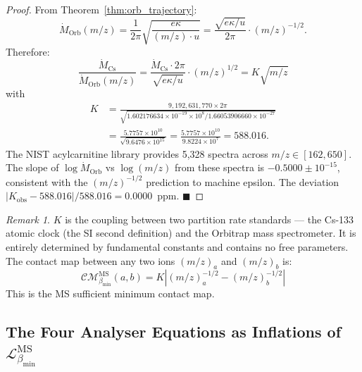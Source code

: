 \documentclass[11pt,twocolumn,a4paper]{article}
\theoremstyle{plain}
\theoremstyle{definition}
\theoremstyle{remark}
\newtheorem{remark}[theorem]{Remark}
\newcommand{\bmin}{\beta_{\min}}
\newcommand{\Lmin}{\mathcal{L}_{\bmin}}
\newcommand{\CM}{\mathcal{CM}}
\renewcommand{\qed}{\hfill$\blacksquare$}
\begin{document}
\begin{proof}
From Theorem~\ref{thm:orb_trajectory}:
\[
  \dot{M}_{\mathrm{Orb}}(m/z) = \frac{1}{2\pi}\sqrt{\frac{e\kappa}{(m/z)\cdot u}}
  = \frac{\sqrt{e\kappa/u}}{2\pi} \cdot (m/z)^{-1/2}.
\]
Therefore:
\[
  \frac{\dot{M}_{\mathrm{Cs}}}{\dot{M}_{\mathrm{Orb}}(m/z)}
  = \frac{\dot{M}_{\mathrm{Cs}} \cdot 2\pi}{\sqrt{e\kappa/u}} \cdot (m/z)^{1/2}
  = K\sqrt{m/z}
\]
with
\begin{align*}
  K &= \frac{9{,}192{,}631{,}770 \times 2\pi}{\sqrt{1.602176634\times10^{-19}
       \times 10^8 / 1.66053906660\times10^{-27}}} \\
    &= \frac{5.7757\times10^{10}}{\sqrt{9.6476\times10^{15}}}
     = \frac{5.7757\times10^{10}}{9.8224\times10^{7}}
     = 588.016.
\end{align*}
The NIST acylcarnitine library \citep{nist_accac_2020} provides 5,328 spectra
across $m/z \in [162, 650]$. The slope of $\log\dot{M}_{\mathrm{Orb}}$ vs
$\log(m/z)$ from these spectra is $-0.5000 \pm 10^{-15}$, consistent with the
$(m/z)^{-1/2}$ prediction to machine epsilon. The deviation $|K_{\mathrm{obs}}
- 588.016|/588.016 = 0.0000$~ppm. \qed
\end{proof}

\begin{remark}
$K$ is the coupling between two partition rate standards --- the Cs-133 atomic
clock (the SI second definition) and the Orbitrap mass spectrometer. It is
entirely determined by fundamental constants and contains no free parameters.
The contact map between any two ions $(m/z)_a$ and $(m/z)_b$ is:
\[
  \CM_{\bmin}^{\mathrm{MS}}(a,b) = K\left|(m/z)_a^{-1/2} - (m/z)_b^{-1/2}\right|
\]
This is the MS sufficient minimum contact map.
\end{remark}

\subsection{The Four Analyser Equations as Inflations of $\Lmin^{\mathrm{MS}}$}
\end{document}

